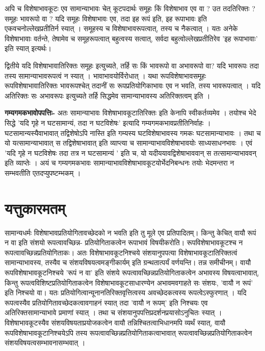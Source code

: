 अपि च विशेषाभावकूटः एव सामान्याभावः चेत् कूटपदार्थः समूहः किं विशेषाभाव एव वा ? उत तदतिरिक्तः ? समूहः भावरूपो वा ? यदि समूहः विशेषाभावः एव, तदा इह रूपं इति, इह रूपाभावः इति एकवचनोल्लेखप्रतीतिर्न स्यात् । समूहस्य च विशेषाभावरूपत्वात्, तस्य च नैकत्वात् । यतः अनेके विशेषाभावाः वर्तन्ते, तेषामेव च समूहरूपत्वात् बहुत्वस्य सत्वात्, सर्वदा बहुत्वोल्लेखप्रतीतिरेव ’इह रूपाभावाः’ इति स्यात् इत्यर्थः।

द्वितीये यदि विशेषाभावातिरिक्तः समूहः इत्युच्यते, तर्हि सः किं भावरूपो वा अभावरूपो वा? यदि भावरूपः तदा तस्य सामान्याभावरूपत्वं न स्यात् । भावाभावयोर्विरोधात् । यथा रूपविशेषाभावसमूहः रूपविशेषाभावातिरिक्तः भावरूपश्चेत् तदानीं सः रूपप्रतियोगिकाभावः एव न भवति, तस्य भावरूपत्वात् । यदि अतिरिक्तः सः अभावरूपः इत्युच्यते तर्हि सिद्धमेव सामान्याभावस्य अतिरिक्तत्वम् इति ।

\textbf{गम्यगमकभावोपपत्तिः-} अतः सामान्याभावः विशेषाभावकूटातिरिक्तः इति केनापि स्वीकर्तव्यमेव । तयोश्च भेदे सिद्धे ’यदि गृहे न घटसामान्यं, तदा न घटविशेषः’ इत्यादि गम्यगमकभावप्रतीतिनिर्वाहः । घटसामान्यस्यैवाभावात् तद्विशेषोऽपि नास्ति इति गम्यस्य घटविशेषाभावस्य गमकः घटसामान्याभावः । तथा च यो यत्सामान्याभावात् स तद्विशेषाभावात् इति व्याप्त्या च सामान्याभावविशेषाभावयोः साध्यसाधनभावः । एवं ’यदि गृहे न घटविशेषः तदा तत्र न घटसामान्यं ’ इति च, यो यदीययावद्विशेषाभाववान् स तत्सामान्याभाववन् इति व्याप्तेः । अयं च गम्यगमकभावः सामान्याभावविशेषाभावकूटयोर्भेदनिबन्धनः तयोः भेदमन्तरा न सम्भवतीति एतदप्युपष्टम्भकम् ।
 	
\section*{यत्तुकारमतम्} 

सामान्यधर्मः विशेषाभावप्रतियोगितावच्छेदको न भवति इति तु मूले एव प्रतिपादितम्। किन्तु केचित् वायौ रूपं न वा इति संशयो रूपत्वावच्छिन्न- प्रतियोगिताकत्वेन रूपाभावं विषयीकरोति। रूपविशेषाभावकूटश्च न रूपत्वावच्छिन्नप्रतियोगिताकः। अतः विशेषाभावकूटनिश्चये संशयानुपपत्या विशेषाभावकूटातिरिक्तत्वं सामान्याभावस्य, तस्यैव च संशयविषयत्वमङ्गीकार्यम् इति ग्रन्थतात्पर्यं वर्णयन्ति। तन्न समीचीनम्। वायौ रूपविशेषाभावकूटनिश्चये ’रूपं न वा’ इति संशये रूपत्वावच्छिन्नप्रतियोगिताकत्वेन अभावस्य विषयत्वाभावात्, किन्तु रूपत्वविशिष्टप्रतियोगिताकत्वेन विशेषाभावकूटसाधारण्येन अभावमवगाहते सः संशयः, ’वायौ न रूपं’ इति निश्चयो वा। यतः प्रतियोगित्वान्यूनानतिरिक्तवृत्तित्वस्य अवच्छेदकत्वस्य रूपत्वेऽस्फुरणात् । यदि रूपत्वस्यैव प्रतियोगितावच्छेदकत्वावगाहनं स्यात् तदा ’वायौ न रूपम्’ इति निश्चयः एव अतिरिक्तसामान्याभावे प्रमाणां स्यात् । तथा च संशयानुपपत्तिप्रदर्शनप्रयासोऽनुचितः स्यात् । विशेषाभावकूटस्यैव संशयविषयताप्रयोजकत्वेन वायौ तन्निश्चितत्वाभिधानमपि व्यर्थं स्यात्, वायौ रूपविशेषाभावकूटानिश्चयेऽपि तस्य रूपत्वावच्छिन्नप्रतियोगिताकत्वाभावात् रूपत्वावच्छिन्नप्रतियोगिताकत्वेन संशयविषयत्वसम्भावनासम्भवात् ।

